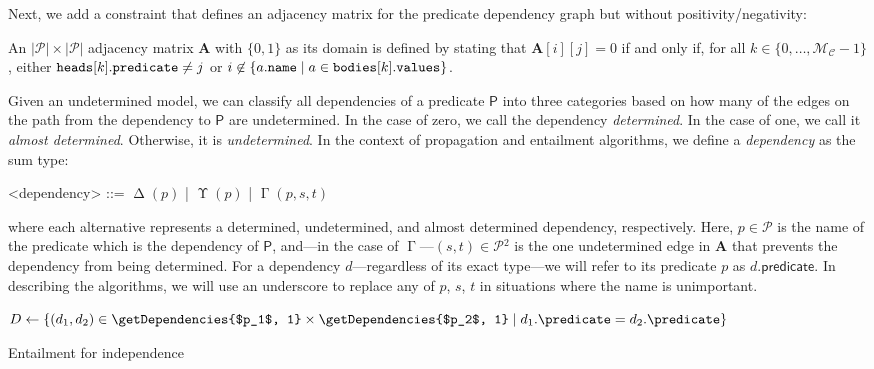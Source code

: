 \documentclass[runningheads]{llncs}
\newcommand{\variable}[1]{\texttt{\textup{#1}}}
\newcommand{\predicates}{\mathcal{P}}
\newcommand{\maxNumClauses}{\mathcal{M}_{\mathcal{C}}}
\DeclareMathOperator{\Determined}{\Delta}
\DeclareMathOperator{\Undetermined}{\Upsilon}
\DeclareMathOperator{\AlmostDetermined}{\Gamma}
\begin{document}
Next, we add a constraint that defines an adjacency matrix for the predicate
dependency graph but without positivity/negativity:
\begin{definition} \label{def:adjacency_matrix}
  An $|\predicates{}| \times |\predicates{}|$ adjacency matrix $\mathbf{A}$ with
  $\{ 0, 1 \}$ as its domain is defined by stating that $\mathbf{A}[i][j] = 0$
  if and only if, for all $k \in \{ 0, \dots, \maxNumClauses{} - 1 \}$, either
  $\variable{heads}[k].\variable{predicate} \ne j$ or $ i \not\in
  \{a.\variable{name} \mid a \in \variable{bodies}[k].\variable{values} \}$.
\end{definition}
Given an undetermined model, we can classify all dependencies of a predicate
$\mathsf{P}$ into three categories based on how many of the edges on the path
from the dependency to $\mathsf{P}$ are undetermined. In the case of zero, we
call the dependency \emph{determined}. In the case of one, we call it
\emph{almost determined}. Otherwise, it is \emph{undetermined}. In the context
of propagation and entailment algorithms, we define a \emph{dependency} as the
sum type:
\begin{grammar}
  <dependency> ::= $\Determined(p)$ | $\Undetermined(p)$ | $\AlmostDetermined(p,
  s, t)$
\end{grammar}
where each alternative represents a determined, undetermined, and almost
determined dependency, respectively. Here, $p \in \predicates{}$ is the name of
the predicate which is the dependency of $\mathsf{P}$, and---in the case of
$\AlmostDetermined$---$(s, t) \in \predicates{}^2$ is the one undetermined edge
in $\mathbf{A}$ that prevents the dependency from being determined. For a
dependency $d$---regardless of its exact type---we will refer to its predicate
$p$ as $d.\mathsf{predicate}$. In describing the algorithms, we will use an
underscore to replace any of $p$, $s$, $t$ in situations where the name is
unimportant.

\begin{algorithm}
  $D \gets \{ (d_1, d_2) \in \getDependencies{$p_1$, 1} \times
  \getDependencies{$p_2$, 1} \mid d_1.\predicate = d_2.\predicate \}$\;
  \leIf{$\exists (\Determined \_, \Determined \_) \in
    D$}{\Return{\textsc{false}}}{\Return{\textsc{undefined}}}
  \caption{Entailment for independence}
  \label{alg:independence_entailment}
\end{algorithm}
\end{document}
